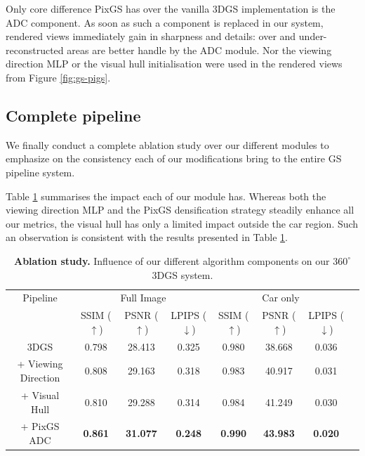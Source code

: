 Only core difference PixGS has over the vanilla 3D\ac{GS} implementation is the \ac{ADC} component. As soon as such a component is replaced in our system, rendered views immediately gain in sharpness and details: over and under-reconstructed areas are better handle by the \ac{ADC} module. Nor the viewing direction MLP or the visual hull initialisation were used in the rendered views from Figure \ref{fig:gs-pigs}. 

\subsection{Complete pipeline}

We finally conduct a complete ablation study over our different modules to emphasize on the consistency each of our modifications bring to the entire \ac{GS} pipeline system. 

Table \ref{table:gs-abaltion} summarises the impact each of our module has. Whereas both the viewing direction \ac{MLP} and the PixGS densification strategy steadily enhance all our metrics, the visual hull has only a limited impact outside the car region. Such an observation is consistent with the results presented in Table \ref{table:gs-abaltion}. 

\begin{table}[htp!]
  \caption{\textbf{Ablation study.} Influence of our different algorithm components on our $360^{\circ}$ 3D\ac{GS} system.}
  \label{table:gs-abaltion}
  \begin{adjustbox}{width=\linewidth}
  \begin{tabular}[h]{c||ccccccc}
  \hline
   Pipeline & \multicolumn{3}{c}{Full Image} & \multicolumn{3}{c}{Car only} \\
   &  SSIM ($\uparrow$) & PSNR ($\uparrow$) & LPIPS ($\downarrow$) & SSIM ($\uparrow$) & PSNR ($\uparrow$) & LPIPS ($\downarrow$)\\
  \hline
  3D\ac{GS} \citep{kerbl20233d}  & 0.798  & 28.413 & 0.325 & 0.980 & 38.668 & 0.036 \\
  + Viewing Direction & 0.808 & 29.163 & 0.318 & 0.983 & 40.917  & 0.031 \\
  + Visual Hull & 0.810 & 29.288 & 0.314 & 0.984 &41.249  & 0.030 \\
  + PixGS \ac{ADC} & \textbf{0.861} & \textbf{31.077} & \textbf{0.248} & \textbf{0.990} & \textbf{43.983} & \textbf{0.020} \\
  \hline 
  \end{tabular}
  \end{adjustbox}
  \end{table}

